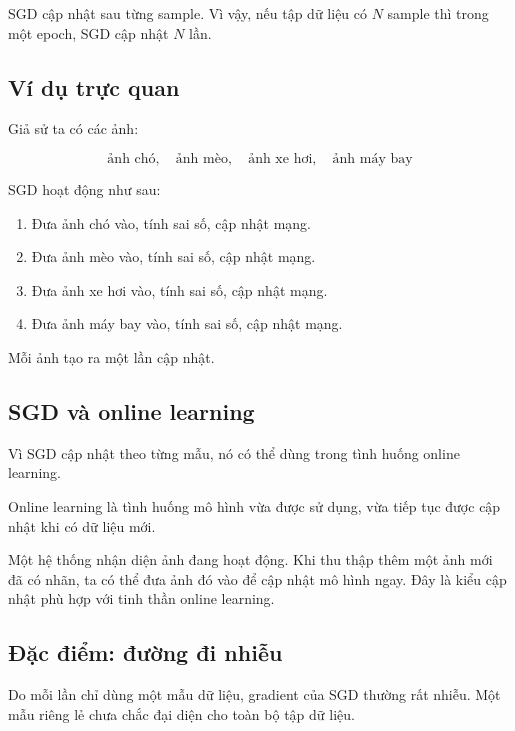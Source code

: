 \begin{ghinho}
SGD cập nhật sau từng sample. Vì vậy, nếu tập dữ liệu có $N$ sample thì trong một epoch, SGD cập nhật $N$ lần.
\end{ghinho}

\subsection{Ví dụ trực quan}

Giả sử ta có các ảnh:

\[
    \text{ảnh chó},\quad
    \text{ảnh mèo},\quad
    \text{ảnh xe hơi},\quad
    \text{ảnh máy bay}
\]

SGD hoạt động như sau:

\begin{enumerate}
    \item Đưa ảnh chó vào, tính sai số, cập nhật mạng.
    \item Đưa ảnh mèo vào, tính sai số, cập nhật mạng.
    \item Đưa ảnh xe hơi vào, tính sai số, cập nhật mạng.
    \item Đưa ảnh máy bay vào, tính sai số, cập nhật mạng.
\end{enumerate}

Mỗi ảnh tạo ra một lần cập nhật.

\subsection{SGD và online learning}

Vì SGD cập nhật theo từng mẫu, nó có thể dùng trong tình huống online learning.

Online learning là tình huống mô hình vừa được sử dụng, vừa tiếp tục được cập nhật khi có dữ liệu mới.

\begin{vidu}
Một hệ thống nhận diện ảnh đang hoạt động. Khi thu thập thêm một ảnh mới đã có nhãn, ta có thể đưa ảnh đó vào để cập nhật mô hình ngay. Đây là kiểu cập nhật phù hợp với tinh thần online learning.
\end{vidu}

\subsection{Đặc điểm: đường đi nhiễu}

Do mỗi lần chỉ dùng một mẫu dữ liệu, gradient của SGD thường rất nhiễu. Một mẫu riêng lẻ chưa chắc đại diện cho toàn bộ tập dữ liệu.

